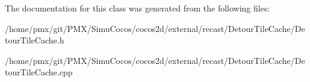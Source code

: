 The documentation for this class was generated from the following files\+:\begin{DoxyCompactItemize}
\item 
/home/pmx/git/\+P\+M\+X/\+Simu\+Cocos/cocos2d/external/recast/\+Detour\+Tile\+Cache/Detour\+Tile\+Cache.\+h\item 
/home/pmx/git/\+P\+M\+X/\+Simu\+Cocos/cocos2d/external/recast/\+Detour\+Tile\+Cache/Detour\+Tile\+Cache.\+cpp\end{DoxyCompactItemize}
